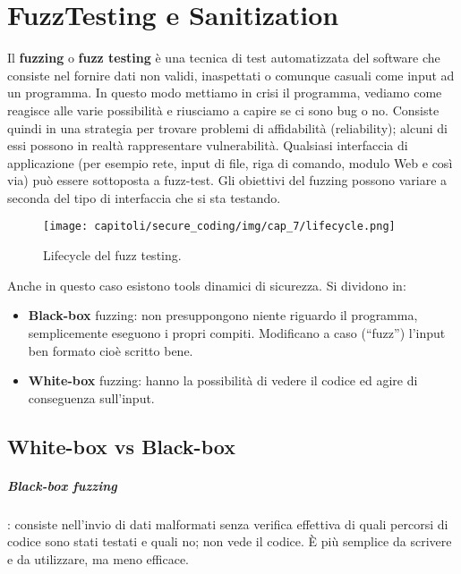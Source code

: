 \chapter{FuzzTesting e Sanitization}

Il \textbf{fuzzing} o \textbf{fuzz testing} è una tecnica di test automatizzata del software che consiste nel fornire dati non validi, inaspettati o comunque casuali come input ad un programma. In questo modo mettiamo in crisi il programma, vediamo come reagisce alle varie possibilità e riusciamo a capire se ci sono bug o no.
Consiste quindi in una strategia per trovare problemi di affidabilità (reliability); alcuni di essi possono in realtà rappresentare vulnerabilità.
Qualsiasi interfaccia di applicazione (per esempio  rete, input di file, riga di comando, modulo Web e così via) può essere sottoposta a fuzz-test.
Gli obiettivi del fuzzing possono variare a seconda del tipo di interfaccia che si sta testando.

\begin{figure}[H]
    \centering
    \texttt{[image: capitoli/secure\_coding/img/cap\_7/lifecycle.png]}
    \caption{Lifecycle del fuzz testing.}
\end{figure}

Anche in questo caso esistono tools dinamici di sicurezza. Si dividono in:

\begin{itemize}
    \item \textbf{Black-box} fuzzing: non presuppongono niente riguardo il programma, semplicemente eseguono i propri compiti. Modificano a caso (``fuzz'') l'input ben formato cioè scritto bene.
    \item \textbf{White-box} fuzzing: hanno la possibilità di vedere il codice ed agire di conseguenza sull'input.
\end{itemize}

\section{White-box vs Black-box}

\paragraph{Black-box fuzzing}: consiste nell'invio di dati malformati senza verifica effettiva di quali percorsi di codice sono stati testati e quali no; non vede il codice.
È più semplice da scrivere e da utilizzare, ma meno efficace.


